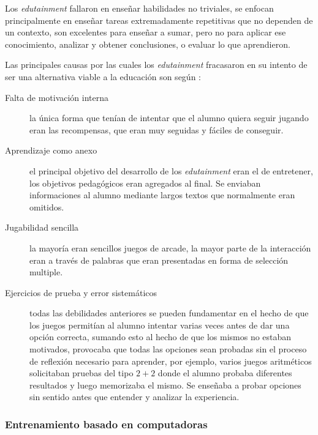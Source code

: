Los \emph{edutainment} fallaron en enseñar habilidades no triviales, se enfocan
principalmente en enseñar tareas extremadamente repetitivas que no dependen de un
contexto\cite{charsky:2010}\cite{egenfeldt2007third}\cite{bruckman1999can}, son
excelentes para enseñar a sumar, pero no para aplicar ese conocimiento, analizar
y obtener conclusiones, o evaluar lo que aprendieron.

Las principales causas por las cuales los \emph{edutainment} fracasaron en su
intento de ser una alternativa viable a la educación son según
\cite{egenfeldt2007third}: 

\begin{description}

    \item[Falta de motivación interna] la única forma que tenían de intentar que
	    el alumno quiera seguir jugando eran las recompensas, que eran muy
	    seguidas y fáciles de conseguir.

    \item[Aprendizaje como anexo] el principal objetivo del desarrollo de los
	    \emph{edutainment} eran el de entretener, los objetivos pedagógicos
	    eran agregados al final. Se enviaban informaciones al alumno
	    mediante largos textos que normalmente eran omitidos.
    
    \item[Jugabilidad sencilla] la mayoría eran sencillos juegos de arcade, la
	    mayor parte de la interacción eran a través de palabras que eran
	    presentadas en forma de selección multiple. 

    \item[Ejercicios de prueba y error sistemáticos] todas las debilidades
	    anteriores se pueden fundamentar en el hecho de que los juegos
	    permitían al alumno intentar varias veces antes de dar una opción
	    correcta, sumando esto al hecho de que los mismos no estaban
	    motivados, provocaba que todas las opciones sean probadas sin el
	    proceso de reflexión necesario para aprender, por ejemplo, varios
	    juegos aritméticos solicitaban pruebas del tipo
	    \begin{math}{2+2}\end{math} donde el alumno probaba diferentes resultados
	    y luego memorizaba el mismo. Se enseñaba a probar opciones sin
	    sentido antes que entender y analizar la experiencia.

\end{description}

\subsubsection{Entrenamiento basado en computadoras}

